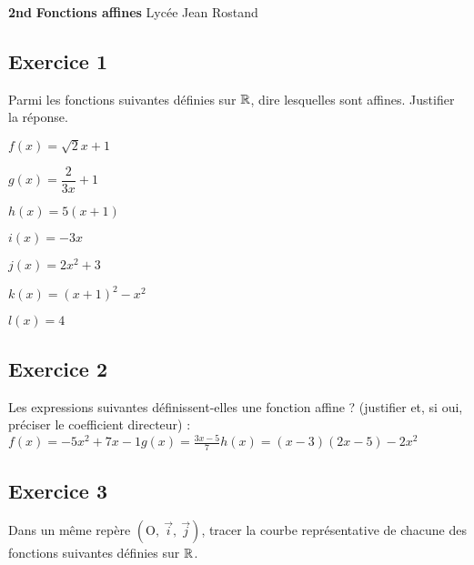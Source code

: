 \documentclass[12pt,a4paper]{article}
\def\Oij{$\left(\text{O},~\vec{i},~\vec{j}\right)$}
\begin{document}
\textbf{2nd} \hfill \textbf{Fonctions affines} \hfill Lycée Jean Rostand\\
\trait 

\subsection*{Exercice 1}

Parmi les fonctions suivantes définies sur $\mathbb{R}$, dire lesquelles sont affines. Justifier la réponse.

\begin{enumerate}
\begin{minipage}[t]{0.4\linewidth}
\item $f(x)=\sqrt{2}x+1$
\item $g(x)=\dfrac{2}{3x}+1$
\end{minipage}
\begin{minipage}[t]{0.4\linewidth}
\item $h(x)=5(x+1)$
\item $i(x)=-3x$
\end{minipage}
\begin{minipage}[t]{0.4\linewidth}
\item $j(x)=2x^2+3$
\item $k(x)=(x+1)^2-x^2$
\end{minipage}
\begin{minipage}[t]{0.4\linewidth}
\item $l(x)=4$

\end{minipage}
\end{enumerate}

\subsection*{Exercice 2}
Les expressions suivantes définissent-elles une fonction affine ? (justifier et, si oui, préciser le coefficient directeur) :\medskip\\
$f(x)=-5x^2+7x-1$\hfill $g(x)=\frac{3x-5}{7}$\hfill $h(x)=(x-3)(2x-5)-2x^2$
\subsection*{Exercice 3}

Dans un même repère \Oij{}, tracer la courbe représentative de chacune des fonctions suivantes définies sur $\mathbb{R}$.
\end{document}

